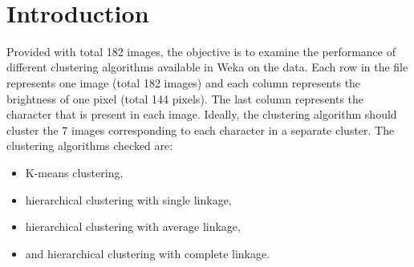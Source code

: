 \documentclass[
11pt, %
a4paper, %
oneside, %
headinclude,footinclude, %
BCOR5mm, %
]{scrartcl}
\title{\ \\[1in] \normalfont\spacedallcaps{Assignment III}} %
\author{\ \\[1in] \spacedlowsmallcaps{Muhammad Khattab}\\{\small\spacedlowsmallcaps{34-14154}} \\[1cm]{\spacedlowsmallcaps{Assoc. Prof. Seif Eldawlatly}}} %
\date{} %
\begin{document}

\renewcommand{\sectionmark}[1]{\markright{\spacedlowsmallcaps{#1}}} %
\lehead{\mbox{\llap{\small\thepage\kern1em\color{halfgray} \vline}\color{halfgray}\hspace{0.5em}\rightmark\hfil}} %

\pagestyle{scrheadings} %

\maketitle %

\newpage

\newpage

\setcounter{tocdepth}{2} %

\tableofcontents %

\newpage

\section{Introduction}
Provided with total 182 images, the objective is to examine the performance of different clustering algorithms available in Weka on the data. Each row in the file represents one image (total 182 images) and each column represents the brightness of one pixel (total 144 pixels). The last column represents the character that is present in each image. Ideally, the clustering algorithm should cluster the 7 images corresponding to each character in a separate cluster. The clustering algorithms checked are:
\begin{itemize}
	\item K-means clustering,
	\item hierarchical clustering with single linkage,
	\item hierarchical clustering with average linkage,
	\item and hierarchical clustering with complete linkage.
\end{itemize}
\end{document}
